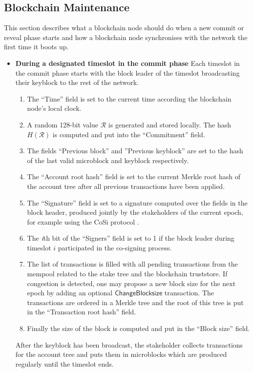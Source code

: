 \documentclass{style/kththesis}
\begin{document}
\begin{appendices}
\section{Blockchain Maintenance}
This section describes what a blockchain node should do when a new commit or reveal phase starts and how a blockchain node synchronises with the network the first time it boots up.
\begin{itemize}
    \item \textbf{During a designated timeslot in the commit phase} Each timeslot in the commit phase starts with the block leader of the timeslot broadcasting their keyblock to the rest of the network.
    \begin{enumerate}
        \item The ``Time'' field is set to the current time according the blockchain node's local clock.
        \item A random 128-bit value $\mathcal{R}$ is generated and stored locally. The hash $H(\mathcal{R})$ is computed and put into the ``Commitment'' field.
        \item The fields ``Previous block'' and ''Previous keyblock'' are set to the hash of the last valid microblock and keyblock respectively.
        \item The ``Account root hash'' field is set to the current Merkle root hash of the account tree after all previous transactions have been applied.
        \item The ``Signature'' field is set to a signature computed over the fields in the block header, produced jointly by the stakeholders of the current epoch, for example using the CoSi protocol \cite{Syta16}.
        \item The \textit{i}th bit of the ``Signers'' field is set to 1 if the block leader during timeslot $i$ participated in the co-signing process.
        \item The list of transactions is filled with all pending transactions from the mempool related to the stake tree and the blockchain truststore. If congestion is detected, one may propose a new block size for the next epoch by adding an optional $\mathsf{ChangeBlocksize}$ transaction. The transactions are ordered in a Merkle tree and the root of this tree is put in the ``Transaction root hash'' field.
        \item Finally the size of the block is computed and put in the ``Block size'' field.
    \end{enumerate}
    After the keyblock has been broadcast, the stakeholder collects transactions for the account tree and puts them in microblocks which are produced regularly until the timeslot ends.

\end{itemize}
\end{appendices}
\end{document}
